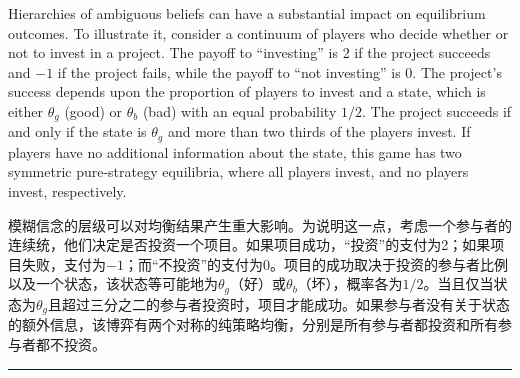 \documentclass[12pt,a4paper]{article}
\newenvironment{original}
  {\par\medskip\noindent\color{black}\ignorespaces}
  {\par\medskip}
\newenvironment{translation}
  {\par\noindent\color{darkblue}\ignorespaces}
  {\par\medskip\noindent\hrule\par\medskip}
\theoremstyle{definition}
\theoremstyle{remark}
\begin{document}
\begin{original}
Hierarchies of ambiguous beliefs can have a substantial impact on equilibrium outcomes. To illustrate it, consider a continuum of players who decide whether or not to invest in a project. The payoff to ``investing'' is 2 if the project succeeds and $-1$ if the project fails, while the payoff to ``not investing'' is 0. The project's success depends upon the proportion of players to invest and a state, which is either $\theta_g$ (good) or $\theta_b$ (bad) with an equal probability $1/2$. The project succeeds if and only if the state is $\theta_g$ and more than two thirds of the players invest. If players have no additional information about the state, this game has two symmetric pure-strategy equilibria, where all players invest, and no players invest, respectively.
\end{original}
\begin{translation}
模糊信念的层级可以对均衡结果产生重大影响。为说明这一点，考虑一个参与者的连续统，他们决定是否投资一个项目。如果项目成功，``投资''的支付为2；如果项目失败，支付为$-1$；而``不投资''的支付为0。项目的成功取决于投资的参与者比例以及一个状态，该状态等可能地为$\theta_g$（好）或$\theta_b$（坏），概率各为$1/2$。当且仅当状态为$\theta_g$且超过三分之二的参与者投资时，项目才能成功。如果参与者没有关于状态的额外信息，该博弈有两个对称的纯策略均衡，分别是所有参与者都投资和所有参与者都不投资。
\end{translation}
\end{document}
